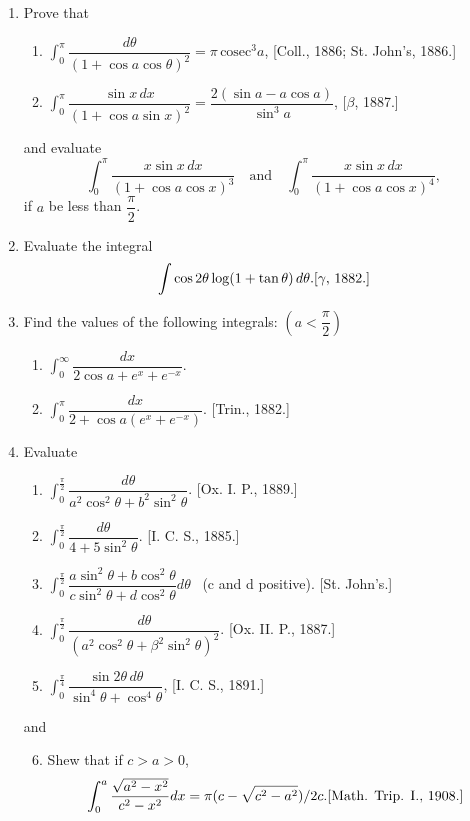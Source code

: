\documentclass[11pt, a4paper]{article}
\newcommand{\source}[1]{\hfill\textnormal{[#1]}}
\begin{document}
\begin{enumerate}[leftmargin=2em]
\item Prove that
\begin{enumerate}[label=(\roman*)]
\item $\displaystyle\int_0^\pi \dfrac{d\theta}{(1+\cos a\cos\theta)^2}=\pi\,\text{cosec}^3a$, \source{Coll., 1886; St. John's, 1886.}
\item $\displaystyle\int_0^\pi \dfrac{\sin x\,dx}{(1+\cos a\sin x)^2}=\dfrac{2(\sin a-a\cos a)}{\sin^3a}$, \source{$\beta$, 1887.}
\end{enumerate}
and evaluate
\[
\int_0^\pi \dfrac{x\sin x\,dx}{(1+\cos a\cos x)^3} \quad\text{and}\quad \int_0^\pi \dfrac{x\sin x\,dx}{(1+\cos a\cos x)^4},
\]
if $a$ be less than $\dfrac\pi2$.

\item Evaluate the integral
\[
\int \cos2\theta\log(1+\tan\theta)\,d\theta. \source{$\gamma$, 1882.}
\]

\item Find the values of the following integrals: \quad $\left(a<\dfrac\pi2\right)$
\begin{enumerate}[label=(\roman*)]
\item $\displaystyle\int_0^\infty \dfrac{dx}{2\cos a+e^x+e^{-x}}$.
\item $\displaystyle\int_0^\pi \dfrac{dx}{2+\cos a(e^x+e^{-x})}$. \source{Trin., 1882.}
\end{enumerate}

\item Evaluate
\begin{enumerate}[label=(\roman*)]
\item $\displaystyle\int_0^{\frac\pi2} \dfrac{d\theta}{a^2\cos^2\theta+b^2\sin^2\theta}$. \source{Ox. I. P., 1889.}
\item $\displaystyle\int_0^{\frac\pi2} \dfrac{d\theta}{4+5\sin^2\theta}$. \source{I. C. S., 1885.}
\item $\displaystyle\int_0^{\frac\pi2} \dfrac{a\sin^2\theta+b\cos^2\theta}{c\sin^2\theta+d\cos^2\theta}d\theta$ \ (c and d positive). \source{St. John's.}
\item $\displaystyle\int_0^{\frac\pi2} \dfrac{d\theta}{(a^2\cos^2\theta+\beta^2\sin^2\theta)^2}$. \source{Ox. II. P., 1887.}
\item $\displaystyle\int_0^{\frac\pi4} \dfrac{\sin2\theta\,d\theta}{\sin^4\theta+\cos^4\theta}$, \source{I. C. S., 1891.}
\end{enumerate}
and
\begin{enumerate}[label=(\roman*)]
\setcounter{enumii}{5}
\item Shew that if $c>a>0$,
\[
\int_0^a \dfrac{\sqrt{a^2-x^2}}{c^2-x^2}dx = \pi(c-\sqrt{c^2-a^2})/2c. \source{Math. Trip. I., 1908.}
\]
\end{enumerate}


\end{enumerate}
\end{document}
